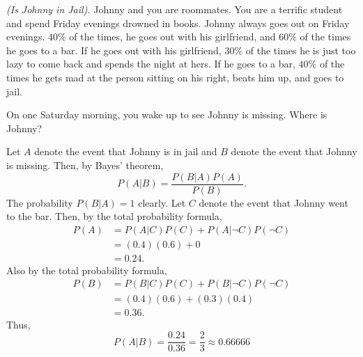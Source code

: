 \begin{problem}[Handout 5, \# 4]
  \emph{(Is Johnny in Jail).} Johnny and you are roommates. You are a
  terrific student and spend Friday evenings drowned in books. Johnny
  always goes out on Friday evenings. \(40\%\) of the times, he goes out
  with his girlfriend, and \(60\%\) of the times he goes to a bar. If he
  goes out with his girlfriend, \(30\%\) of the times he is just too lazy
  to come back and spends the night at hers. If he goes to a bar, \(40\%\)
  of the times he gets mad at the person sitting on his right, beats him
  up, and goes to jail.

  \noindent
  On one Saturday morning, you wake up to see Johnny is missing. Where is
  Johnny?
\end{problem}
\begin{solution}
  Let \(A\) denote the event that Johnny is in jail and \(B\) denote the
  event that Johnny is missing. Then, by Bayes' theorem,
  \[
    P(A|B)=\frac{P(B|A)P(A)}{P(B)}.
  \]
  The probability \(P(B|A)=1\) clearly. Let \(C\) denote the event that
  Johnny went to the bar. Then, by the total probability formula,
  \begin{align*}
    P(A)&=P(A|C)P(C)+P(A|\lnot C)P(\lnot C)\\
        &=(0.4)(0.6)+0\\
        &=0.24.
  \end{align*}
  Also by the total probability formula,
  \begin{align*}
    P(B)&=P(B|C)P(C)+P(B|\lnot C)P(\lnot C)\\
        &=(0.4)(0.6)+(0.3)(0.4)\\
        &=0.36.
  \end{align*}
  Thus,
  \[
    P(A|B)=\frac{0.24}{0.36}=\frac{2}{3}\approx\num{0.66666}
  \]
\end{solution}

